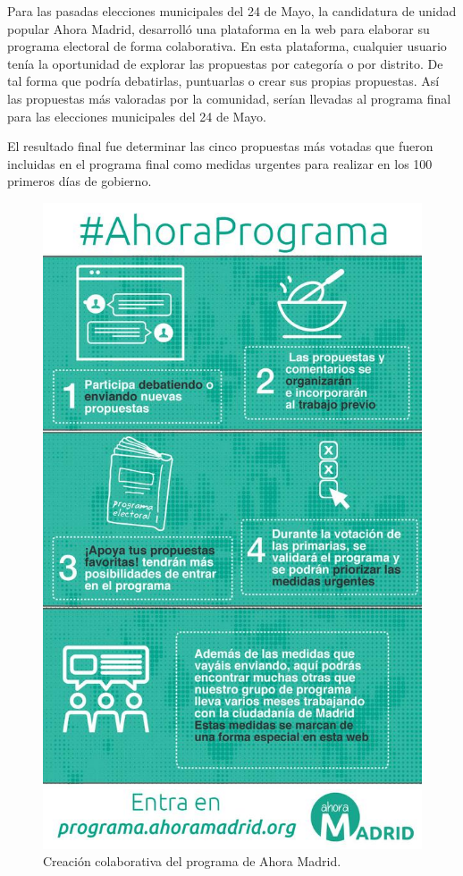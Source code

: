 Para las pasadas elecciones municipales del 24 de Mayo, la candidatura de unidad popular Ahora Madrid, desarrolló una plataforma en la web para elaborar su programa electoral de forma colaborativa. En esta plataforma, cualquier usuario tenía la oportunidad de explorar las propuestas por categoría o por distrito. De tal forma que podría debatirlas, puntuarlas o crear sus propias propuestas. Así las propuestas más valoradas por la comunidad, serían llevadas al programa final para las elecciones municipales del 24 de Mayo.

El resultado final fue determinar las cinco propuestas más votadas que fueron incluidas en el programa final como medidas urgentes para realizar en los 100 primeros días de gobierno. 

\begin{figure}[!]
\centering
\includegraphics[keepaspectratio, scale=0.25]{Media/Captures/programaAhoraMadrid.jpg}
\caption{Creación colaborativa del programa de Ahora Madrid.}
\label{fig:programaAhoraMadrid}
\end{figure}

